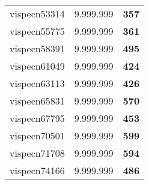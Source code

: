 \begin{tabular}{cc||c}
vispecn53314     & 9.999.999        & {\bf 357}       \\ 
vispecn55775     & 9.999.999        & {\bf 361}       \\ 
vispecn58391     & 9.999.999        & {\bf 495}       \\ 
vispecn61049     & 9.999.999        & {\bf 424}       \\ 
vispecn63113     & 9.999.999        & {\bf 426}       \\ 
vispecn65831     & 9.999.999        & {\bf 570}       \\ 
vispecn67795     & 9.999.999        & {\bf 453}       \\ 
vispecn70501     & 9.999.999        & {\bf 599}       \\ 
vispecn71708     & 9.999.999        & {\bf 594}       \\ 
vispecn74166     & 9.999.999        & {\bf 486}       \\ 
\end{tabular}
